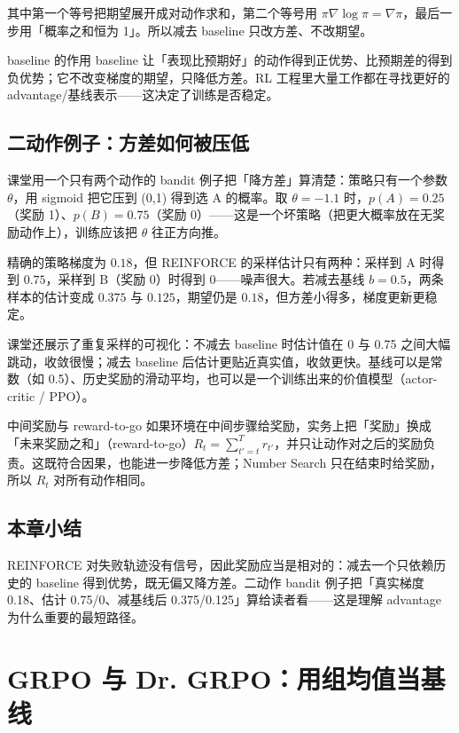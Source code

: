 \documentclass[a4paper]{article}
\begin{document}
其中第一个等号把期望展开成对动作求和，第二个等号用 $\pi \nabla\log\pi = \nabla\pi$，最后一步用「概率之和恒为 1」。所以减去 baseline 只改方差、不改期望。

\begin{importantbox}{baseline 的作用}
baseline 让「表现比预期好」的动作得到正优势、比预期差的得到负优势；它不改变梯度的期望，只降低方差。RL 工程里大量工作都在寻找更好的 advantage/基线表示——这决定了训练是否稳定。
\end{importantbox}

\subsection{二动作例子：方差如何被压低}

课堂用一个只有两个动作的 bandit 例子把「降方差」算清楚：策略只有一个参数 $\theta$，用 sigmoid 把它压到 (0,1) 得到选 A 的概率。取 $\theta=-1.1$ 时，$p(A)=0.25$（奖励 1）、$p(B)=0.75$（奖励 0）——这是一个坏策略（把更大概率放在无奖励动作上），训练应该把 $\theta$ 往正方向推。

精确的策略梯度为 $0.18$，但 REINFORCE 的采样估计只有两种：采样到 A 时得到 $0.75$，采样到 B（奖励 0）时得到 $0$——噪声很大。若减去基线 $b=0.5$，两条样本的估计变成 $0.375$ 与 $0.125$，期望仍是 $0.18$，但方差小得多，梯度更新更稳定。

课堂还展示了重复采样的可视化：不减去 baseline 时估计值在 0 与 0.75 之间大幅跳动，收敛很慢；减去 baseline 后估计更贴近真实值，收敛更快。基线可以是常数（如 0.5）、历史奖励的滑动平均，也可以是一个训练出来的价值模型（actor-critic / PPO）。

\begin{knowledgebox}{中间奖励与 reward-to-go}
如果环境在中间步骤给奖励，实务上把「奖励」换成「未来奖励之和」（reward-to-go）$R_t=\sum_{t'=t}^{T} r_{t'}$，并只让动作对之后的奖励负责。这既符合因果，也能进一步降低方差；Number Search 只在结束时给奖励，所以 $R_t$ 对所有动作相同。
\end{knowledgebox}

\subsection{本章小结}
REINFORCE 对失败轨迹没有信号，因此奖励应当是相对的：减去一个只依赖历史的 baseline 得到优势，既无偏又降方差。二动作 bandit 例子把「真实梯度 0.18、估计 0.75/0、减基线后 0.375/0.125」算给读者看——这是理解 advantage 为什么重要的最短路径。

\section{GRPO 与 Dr. GRPO：用组均值当基线}
\end{document}
